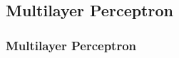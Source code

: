 \subsection{Multilayer Perceptron}

\begin{frame}
\frametitle{Multilayer Perceptron}
\blindtext
\end{frame}
